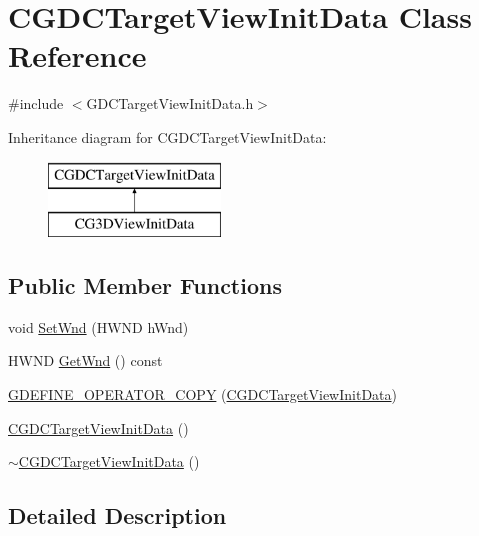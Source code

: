 \hypertarget{class_c_g_d_c_target_view_init_data}{}\section{C\+G\+D\+C\+Target\+View\+Init\+Data Class Reference}
\label{class_c_g_d_c_target_view_init_data}


{\ttfamily \#include $<$G\+D\+C\+Target\+View\+Init\+Data.\+h$>$}

Inheritance diagram for C\+G\+D\+C\+Target\+View\+Init\+Data\+:\begin{figure}[H]
\begin{center}
\leavevmode
\includegraphics[height=2.000000cm]{class_c_g_d_c_target_view_init_data}
\end{center}
\end{figure}
\subsection*{Public Member Functions}
\begin{DoxyCompactItemize}
\item 
void \hyperlink{class_c_g_d_c_target_view_init_data_a08b1ec82cd9c24c444b1bfde8ab3347a}{Set\+Wnd} (H\+W\+N\+D h\+Wnd)
\item 
H\+W\+N\+D \hyperlink{class_c_g_d_c_target_view_init_data_aef49b25941e8f46739e7dbb204cf0f11}{Get\+Wnd} () const 
\item 
\hyperlink{class_c_g_d_c_target_view_init_data_a05492785493b0a4135ebbc64ed511ee5}{G\+D\+E\+F\+I\+N\+E\+\_\+\+O\+P\+E\+R\+A\+T\+O\+R\+\_\+\+C\+O\+P\+Y} (\hyperlink{class_c_g_d_c_target_view_init_data}{C\+G\+D\+C\+Target\+View\+Init\+Data})
\item 
\hyperlink{class_c_g_d_c_target_view_init_data_af43c1c471bb9d58e6969c62045d3cf70}{C\+G\+D\+C\+Target\+View\+Init\+Data} ()
\item 
\hyperlink{class_c_g_d_c_target_view_init_data_a9850fc082bfd2288b7c76bd3bf362a1a}{$\sim$\+C\+G\+D\+C\+Target\+View\+Init\+Data} ()
\end{DoxyCompactItemize}


\subsection{Detailed Description}

